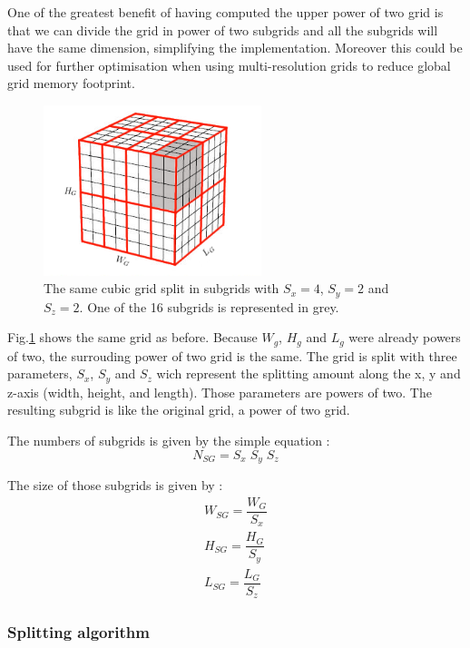 \documentclass[12pt,journal,compsoc]{IEEEtran}
\begin{document}
One of the greatest benefit of having computed the upper power of two grid is that we can divide the grid in power of two subgrids and all the subgrids will have the same dimension, simplifying the implementation. Moreover this could be used for further optimisation when using multi-resolution grids to reduce global grid memory footprint. 

\begin{figure}[!h]
\centering
\includegraphics[width=2.5in]{subgrid}
\caption{The same cubic grid split in subgrids with $S_x = 4$, $S_y=2$ and $S_z=2$. One of the 16 subgrids is represented in grey.}
\label{subgrids}
\end{figure}

Fig.\ref{subgrids} shows the same grid as before. Because $W_g$, $H_g$ and $L_g$ were already powers of two, the surrouding power of two grid is the same. The grid is split with three parameters, $S_x$, $S_y$ and $S_z$ wich represent the splitting amount along the x, y and z-axis (width, height, and length). Those parameters are powers of two. The resulting subgrid is like the original grid, a power of two grid. 
\begin{samepage}
The numbers of subgrids is given by the simple equation :
\begin{equation}
	N_{SG} = S_x\;S_y\;S_z
\end{equation}
\end{samepage}

\begin{samepage}
The size of those subgrids is given by :
\begin{eqnarray}
	W_{SG} = \dfrac{W_G}{S_x}\\
	H_{SG} = \dfrac{H_G}{S_y}\\
	L_{SG} = \dfrac{L_G}{S_z}
\end{eqnarray}
\end{samepage}

\subsubsection{Splitting algorithm}
\end{document}
